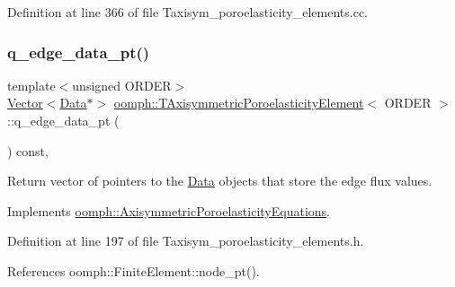 Definition at line 366 of file Taxisym\+\_\+poroelasticity\+\_\+elements.\+cc.

\mbox{\label{classoomph_1_1TAxisymmetricPoroelasticityElement_af13ce25c9c2d1a907690319576631b87}} 
\subsubsection{\texorpdfstring{q\+\_\+edge\+\_\+data\+\_\+pt()}{q\_edge\_data\_pt()}}
{\footnotesize\ttfamily template$<$unsigned O\+R\+D\+ER$>$ \\
\hyperlink{classoomph_1_1Vector}{Vector}$<$\hyperlink{classoomph_1_1Data}{Data}$\ast$$>$ \hyperlink{classoomph_1_1TAxisymmetricPoroelasticityElement}{oomph\+::\+T\+Axisymmetric\+Poroelasticity\+Element}$<$ O\+R\+D\+ER $>$\+::q\+\_\+edge\+\_\+data\+\_\+pt (\begin{DoxyParamCaption}{ }\end{DoxyParamCaption}) const\hspace{0.3cm}{\ttfamily [inline]}, {\ttfamily [virtual]}}



Return vector of pointers to the \hyperlink{classoomph_1_1Data}{Data} objects that store the edge flux values. 



Implements \hyperlink{classoomph_1_1AxisymmetricPoroelasticityEquations_a278e2b053f4c30b9da7a00ec063f1d7f}{oomph\+::\+Axisymmetric\+Poroelasticity\+Equations}.



Definition at line 197 of file Taxisym\+\_\+poroelasticity\+\_\+elements.\+h.



References oomph\+::\+Finite\+Element\+::node\+\_\+pt().

\mbox{\label{classoomph_1_1TAxisymmetricPoroelasticityElement_a2b121fc589935b789d63731c5195adb5}} 
